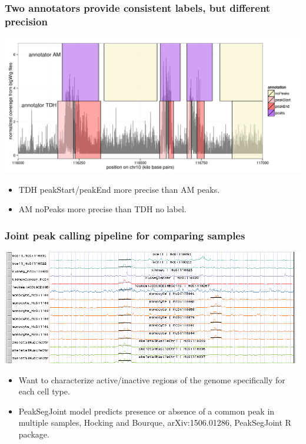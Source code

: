 \documentclass{beamer}
\begin{document}
\begin{frame}
  \frametitle{Two annotators provide consistent labels, but different
    precision}
  \includegraphics[width=1.1\textwidth]{screenshot-several-annotators}

  \begin{itemize}
  \item TDH peakStart/peakEnd more precise than AM peaks.
  \item AM noPeaks more precise than TDH no label.
  \end{itemize}
\end{frame}

\begin{frame}
  \frametitle{Joint peak calling pipeline for comparing samples}
\includegraphics[width=\textwidth]{PeakSegJoint-monocytes-up}

\begin{itemize}
\item Want to characterize active/inactive regions of the genome
  specifically for each cell type.
\item PeakSegJoint model predicts presence or absence of a common peak
  in multiple samples, Hocking and Bourque, arXiv:1506.01286,
  PeakSegJoint R package.
\end{itemize}
\end{frame}
\end{document}
